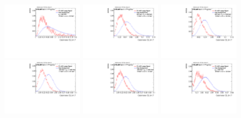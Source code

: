 \begin{figure}
\includegraphics[width=0.3\textwidth]{sascha_input/Appendix/Distributions/w/distributions/beta17/h_recoJet_C2_17_bin1.pdf} \hspace{1mm}
\includegraphics[width=0.3\textwidth]{sascha_input/Appendix/Distributions/w/distributions/beta17/h_recoJet_C2_17_bin2.pdf} \hspace{1mm}
\includegraphics[width=0.3\textwidth]{sascha_input/Appendix/Distributions/w/distributions/beta17/h_recoJet_C2_17_bin3.pdf} 
\bigskip
\includegraphics[width=0.3\textwidth]{sascha_input/Appendix/Distributions/w/distributions/beta17/h_recoJet_C2_17_bin4.pdf} \hspace{1mm}
\includegraphics[width=0.3\textwidth]{sascha_input/Appendix/Distributions/w/distributions/beta17/h_recoJet_C2_17_bin5.pdf} \hspace{1mm}
\includegraphics[width=0.3\textwidth]{sascha_input/Appendix/Distributions/w/distributions/beta17/h_recoJet_C2_17_bin6.pdf}

\end{figure}
